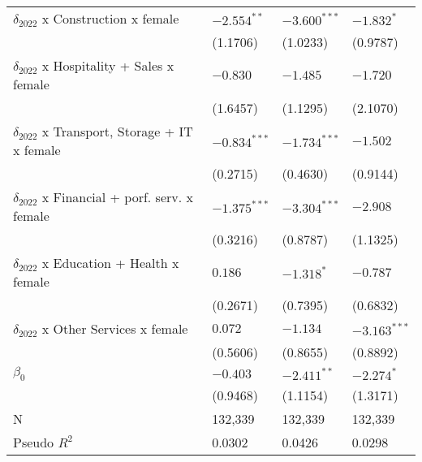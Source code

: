 \begin{tabular}{llll}
$\delta_{2022}$ x Construction x female            &      $-2.554^{**}$ &     $-3.600^{***}$ &         $-1.832^*$ \\
                                                   &           (1.1706) &           (1.0233) &           (0.9787) \\
$\delta_{2022}$ x Hospitality + Sales x female     &           $-0.830$ &           $-1.485$ &           $-1.720$ \\
                                                   &           (1.6457) &           (1.1295) &           (2.1070) \\
$\delta_{2022}$ x Transport, Storage + IT x female &     $-0.834^{***}$ &     $-1.734^{***}$ &           $-1.502$ \\
                                                   &           (0.2715) &           (0.4630) &           (0.9144) \\
$\delta_{2022}$ x Financial + porf. serv. x female &     $-1.375^{***}$ &     $-3.304^{***}$ &           $-2.908$ \\
                                                   &           (0.3216) &           (0.8787) &           (1.1325) \\
$\delta_{2022}$ x Education + Health x female      &            $0.186$ &         $-1.318^*$ &           $-0.787$ \\
                                                   &           (0.2671) &           (0.7395) &           (0.6832) \\
$\delta_{2022}$ x Other Services x female          &            $0.072$ &           $-1.134$ &     $-3.163^{***}$ \\
                                                   &           (0.5606) &           (0.8655) &           (0.8892) \\
$\beta_0$                                          &           $-0.403$ &      $-2.411^{**}$ &         $-2.274^*$ \\
                                                   &           (0.9468) &           (1.1154) &           (1.3171) \\
N                                                  &            132,339 &            132,339 &            132,339 \\
Pseudo $R^2$                                       &             0.0302 &             0.0426 &             0.0298 \\
\bottomrule
\end{tabular}
